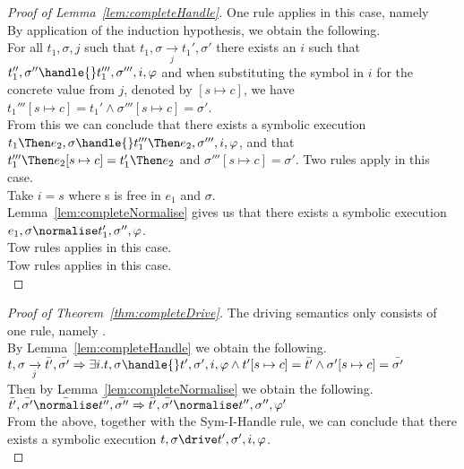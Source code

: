 \begin{proof}[Proof of Lemma~\ref{lem:completeHandle}]
  {
  One rule applies in this case, namely \\

  By application of the induction hypothesis, we obtain the following.\\
  For all $t_1,\sigma,j$ such that $t_1,\sigma\xrightarrow[j]{}t_1',\sigma'$ there exists an $i$ such that $t_1'',\sigma''\handle{}t_1''',\sigma''',i,\phi$ and when substituting the symbol in $i$ for the concrete value from $j$, denoted by $[s\mapsto c]$, we have $t_1'''[s\mapsto c] = t_1'\land \sigma'''[s\mapsto c]=\sigma'$.\\
  From this we can conclude that there exists a symbolic execution $t_1\Then e_2,\sigma\handle{} t_1'''\Then e_2,\sigma''',i,\phi$, and that $t_1'''\Then e_2[s\mapsto c] = t_1'\Then e_2$ and $\sigma'''[s\mapsto c]=\sigma'$.
  }
  {
  Two rules apply in this case.\\
    {
      Take $i=s$ where s is free in $e_1$ and $\sigma$.\\
      Lemma~\ref{lem:completeNormalise} gives us that there exists a symbolic execution $e_1,\sigma\normalise t_1',\sigma'',\phi$.\\
    }
    {
    }
  }
    {
    Tow rules applies in this case.\\
    }
    {
    Tow rules applies in this case.\\
    }

\end{proof}



\begin{proof}[Proof of Theorem~\ref{thm:completeDrive}]
  The driving semantics only consists of one rule, namely .\\
  By Lemma~\ref{lem:completeHandle} we obtain the following.\\
  $t,\sigma\xrightarrow[j]{}\bar{t'},\bar{\sigma'}\implies \exists i . t,\sigma\handle{}t',\sigma',i,\phi \land t'[s\mapsto c]=\bar{t'}\land \sigma'[s\mapsto c]=\bar{\sigma'}$\\
  Then by Lemma~\ref{lem:completeNormalise} we obtain the following.\\
  $\bar{t'},\bar{\sigma'}\bar{\normalise}\bar{t''},\bar{\sigma''}\implies \bar{t'},\bar{\sigma'}\normalise t'',\sigma'',\phi'$\\
  From the above, together with the Sym-I-Handle rule, we can conclude that there exists a symbolic execution $t,\sigma\drive t',\sigma',i,\phi$.\\
\end{proof}
